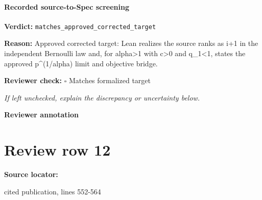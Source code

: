 \documentclass[10pt]{article}
\newcommand{\reviewerbox}{%
  \par\noindent\fbox{\parbox{0.96\linewidth}{\rule{0pt}{0.38in}}}\par
}
\newcommand{\reviewmatch}[1]{%
  \par\noindent\textbf{Reviewer check:} $\square$\; #1\par
  \noindent\emph{If left unchecked, explain the discrepancy or uncertainty below.}\par
}
\begin{document}
\paragraph{Recorded source-to-Spec screening}
\textbf{Verdict:} \texttt{matches\_approved\_corrected\_target}
\\
{\raggedright
\textbf{Reason:} Approved corrected target:\allowbreak{} Lean realizes the source ranks as i+1 in the independent Bernoulli law and, for alpha>1 with c>0 and q\_\allowbreak{}1<1, states the approved p\textasciicircum{}(1/\allowbreak{}alpha) limit and objective bridge.\allowbreak{}
\par}
\reviewmatch{Matches formalized target}
\noindent\textbf{Reviewer annotation}\par
\reviewerbox
\clearpage
\hypertarget{source-claim-49b00f2a87213781}{}
\section*{Review row 12}
\textbf{Source locator:} {\footnotesize\raggedright cited publication, lines 552-\allowbreak{}564\par}
\end{document}

